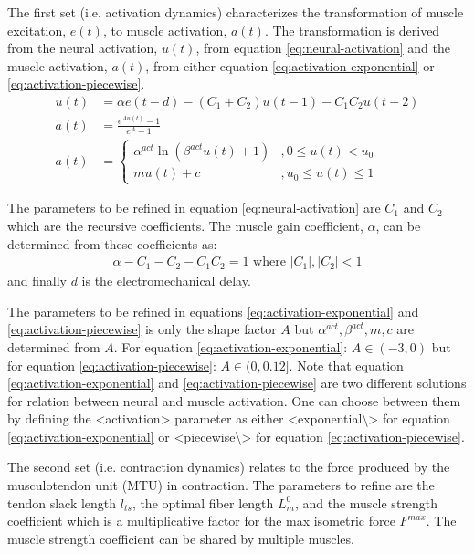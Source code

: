 The first set (i.e. activation dynamics) characterizes the transformation of muscle excitation, $e(t)$, to muscle activation, $a(t)$. The transformation is derived from the neural activation, $u(t)$, from equation \ref{eq:neural-activation} and the muscle activation, $a(t)$, from either equation \ref{eq:activation-exponential} or \ref{eq:activation-piecewise}.
\begin{align}
\label{eq:neural-activation}
    u(t) &= \alpha e(t-d) - (C_1 + C_2)u(t-1) - C_1 C_2 u(t-2) \\
\label{eq:activation-exponential}
    a(t) &= \frac{e^{Au(t)} - 1}{e^A - 1}\\
\label{eq:activation-piecewise}
    a(t) &= \begin{cases}
        \alpha^{act}\ln \left( \beta^{act}u(t)+1 \right) &, 0\leq u(t) < u_0\\
        mu(t) + c &, u_0 \leq u(t) \leq 1
    \end{cases}
\end{align}

The parameters to be refined in equation \ref{eq:neural-activation} are $C_1$ and $C_2$ which are the recursive coefficients. The muscle gain coefficient, $\alpha$, can be determined from these coefficients as:
\begin{align}
\label{eq:muscle-gain-coeff}
    \alpha - C_1 - C_2 - C_1 C_2 = 1 \text{ where } \left|C_1\right|,\left|C_2\right| < 1
\end{align}
and finally $d$ is the electromechanical delay.

The parameters to be refined in equations \ref{eq:activation-exponential} and \ref{eq:activation-piecewise} is only the shape factor $A$ but $\alpha^{act}, \beta^{act}, m, c$ are determined from $A$. 
For equation \ref{eq:activation-exponential}: $A\in (-3, 0)$ but for equation \ref{eq:activation-piecewise}: $A\in (0, 0.12]$. 
Note that equation \ref{eq:activation-exponential} and \ref{eq:activation-piecewise} are two different solutions for relation between neural and muscle activation. 
One can choose between them by defining the <activation> parameter as either <exponential\textbackslash{}> for equation \ref{eq:activation-exponential} or <piecewise\textbackslash{}> for equation \ref{eq:activation-piecewise}.

The second set (i.e. contraction dynamics) relates to the force produced by the musculotendon unit (MTU) in contraction. The parameters to refine are the tendon slack length $l_{ts}$, the optimal fiber length $L_m^0$, and the muscle strength coefficient which is a multiplicative factor for the max isometric force $F^{max}$. The muscle strength coefficient can be shared by multiple muscles. 

